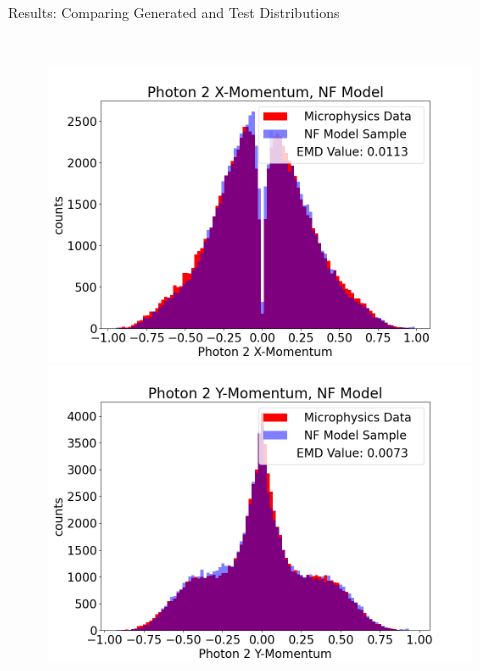\documentclass[aspectratio=169]{beamer}
\begin{document}
\begin{frame}{Results: Comparing Generated and Test Distributions}
\begin{columns}
             \begin{figure}[H]
            \centering
            \includegraphics[width=.97\textwidth]{images/Features16/Photon_2_X-Momentum,_NF_Model.png}
            \includegraphics[width=.97\textwidth]{images/Features16/Photon_2_Y-Momentum,_NF_Model.png}
            \end{figure}
    \end{columns}
\end{frame}
\end{document}
